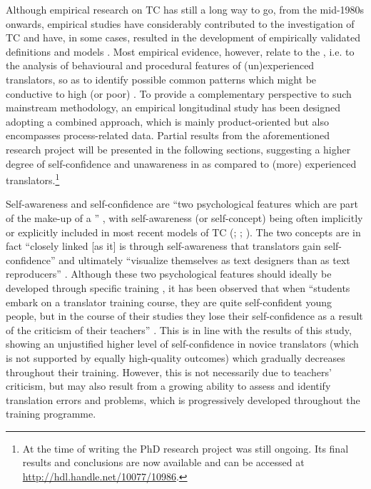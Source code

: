 \documentclass[output=paper]{LSP/langsci}
\begin{document}
Although empirical research on TC has still a long way to go, from the mid-1980s onwards, empirical studies have considerably contributed to the investigation of TC and have, in some cases, resulted in the development of empirically validated definitions and models \citep{Gopferich2009Towards, PACTE2003}. Most empirical evidence, however, relate to the , i.e. to the analysis of behavioural and procedural features of (un)experienced translators, so as to identify possible common patterns which might be conductive to high (or poor) . To provide a complementary perspective to such mainstream methodology, an empirical longitudinal study has been designed adopting a combined approach, which is mainly product-oriented but also encompasses process-related data. Partial results from the aforementioned research project will be presented in the following sections, suggesting a higher degree of self-confidence and unawareness in  as compared to (more) experienced translators.\footnote{At the time of writing the PhD research project was still ongoing. Its final results and conclusions are now available \citep{Quinci2015b} and can be accessed at \url{http://hdl.handle.net/10077/10986}.}

Self-awareness and self-confidence are ``two psychological features which are part of the make-up of a '' \citep[32]{Kussmaul1995Training}, with self-aware\-ness (or self-concept) being often implicitly or explicitly included in most recent models of TC (\citealt{Gopferich2009Towards}; \citealt{Kiraly1995Pathways}; \citealt[93]{PACTE2003}). The two concepts are in fact ``closely linked [as it] is through self-awareness that translators gain self-confidence'' \citep[32]{Kussmaul1995Training} and ultimately ``visualize themselves as text designers than as text reproducers'' \citep[34]{Gopferich2009Towards}. Although these two psychological features should ideally be developed through specific training \citep[34]{Gopferich2009Towards}, it has been observed that when ``students embark on a translator training course, they are quite self-confident young people, but in the course of their studies they lose their self-confidence as a result of the criticism of their teachers'' \citep[32]{Kussmaul1995Training}. This is in line with the results of this study, showing an unjustified higher level of self-confidence in novice translators (which is not supported by equally high-quality outcomes) which gradually decreases throughout their training. However, this is not necessarily due to teachers' criticism, but may also result from a growing ability to assess  and identify translation errors and problems, which is progressively developed throughout the training programme.
\end{document}
